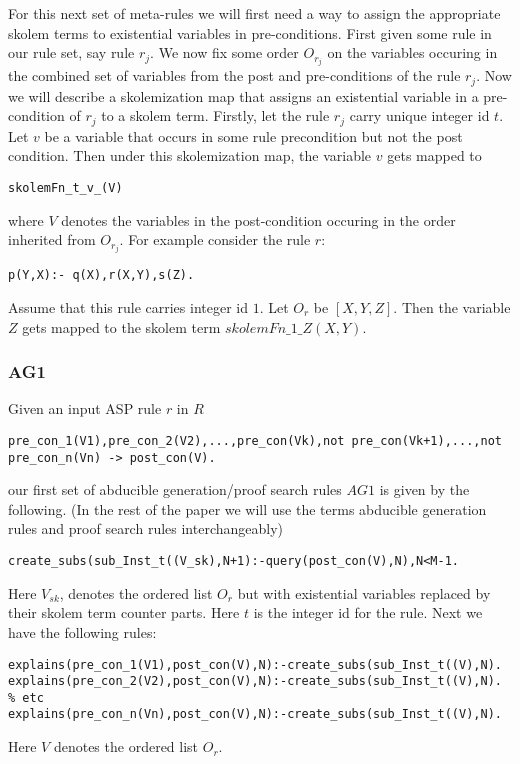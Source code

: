 \documentclass[sigconf]{acmart}
\begin{document}
For this next set of meta-rules we will first need a way to assign the
appropriate skolem terms to existential variables in pre-conditions. First
given some rule in our rule set, say rule $r_{j}$. We now fix some order
$O_{r_{j}}$ on the variables occuring in the combined set of variables from
the post and pre-conditions of the rule $r_{j}$. Now we will describe a
skolemization map that assigns an existential variable in a pre-condition of
$r_{j}$ to a skolem term. Firstly, let the rule $r_{j}$ carry unique integer
id $t$. Let $v$ be a variable that occurs in some rule precondition but not
the post condition. Then under this skolemization map, the variable $v$ gets
mapped to
\begin{lstlisting}[frame=none]
skolemFn_t_v_(V)    
\end{lstlisting}
where $V$ denotes the variables in the post-condition occuring in the order inherited from $O_{r_{j}}$. For example consider the rule $r$: 
\begin{lstlisting}[frame=none]
p(Y,X):- q(X),r(X,Y),s(Z).    
\end{lstlisting} 
Assume that this rule carries integer id $1$. Let $O_{r}$ be $[X,Y,Z]$. Then
the variable $Z$ gets mapped to the skolem term $skolemFn\_1\_Z(X,Y)$.

\subsubsection{AG1}
Given an input ASP rule $r$ in $R$
\begin{lstlisting}[frame=none]
pre_con_1(V1),pre_con_2(V2),...,pre_con(Vk),not pre_con(Vk+1),...,not pre_con_n(Vn) -> post_con(V).
\end{lstlisting}
our first set of abducible generation/proof search rules $AG1$ is given by the following. (In the rest of the paper we will use the terms abducible generation rules and proof search rules interchangeably) 
\begin{lstlisting}[frame=none]
create_subs(sub_Inst_t((V_sk),N+1):-query(post_con(V),N),N<M-1.
\end{lstlisting}
Here $V_{sk}$, denotes the ordered list $O_{r}$ but with existential variables replaced by their skolem term counter parts. Here $t$ is the integer id for the rule.
Next we have the following rules:
\begin{lstlisting}[frame=none]
explains(pre_con_1(V1),post_con(V),N):-create_subs(sub_Inst_t((V),N).
explains(pre_con_2(V2),post_con(V),N):-create_subs(sub_Inst_t((V),N).
% etc
explains(pre_con_n(Vn),post_con(V),N):-create_subs(sub_Inst_t((V),N).
\end{lstlisting}
Here $V$ denotes the ordered list $O_{r}$.
\end{document}
